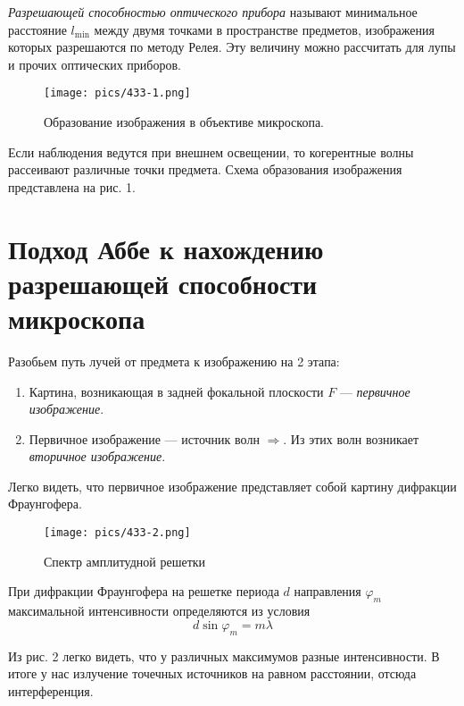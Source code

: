 \documentclass[a4paper,12pt]{article}
\begin{document}
\textit{Разрешающей способностью оптического прибора} называют минимальное расстояние $l_{\min}$ между двумя точками в пространстве предметов, изображения которых разрешаются по методу Релея. Эту величину можно рассчитать для лупы и прочих оптических приборов.
	
\begin{figure}[h]
    \begin{center}
        \texttt{[image: pics/433-1.png]}
        \caption{Образование изображения в объективе микроскопа.}
    \label{ust}
    \end{center}
\end{figure}

Если наблюдения ведутся при внешнем освещении, то когерентные волны рассеивают различные точки предмета. Схема образования изображения представлена на рис. 1.

\section*{Подход Аббе к нахождению разрешающей способности микроскопа}
Разобьем путь лучей от предмета к изображению на 2 этапа:
\begin{enumerate}
    \item Картина, возникающая в задней фокальной плоскости $F$ --- \textit{первичное изображение}. 
    \item Первичное изображение --- источник волн $\Rightarrow$. Из этих волн возникает \textit{вторичное изображение}.
\end{enumerate}

Легко видеть, что первичное изображение представляет собой картину дифракции Фраунгофера. 

\begin{figure}[h]
    \begin{center}
        \texttt{[image: pics/433-2.png]}
        \caption{Спектр амплитудной решетки}
    \end{center}
\end{figure}
При дифракции Фраунгофера на решетке периода $d$ направления $\varphi_m$ максимальной интенсивности определяются из условия 
\begin{equation}
d \sin \varphi_m = m \lambda
\end{equation}

Из рис. 2 легко видеть, что у различных максимумов разные интенсивности.
В итоге у нас излучение точечных источников на равном расстоянии, отсюда интерференция. 
\end{document}
